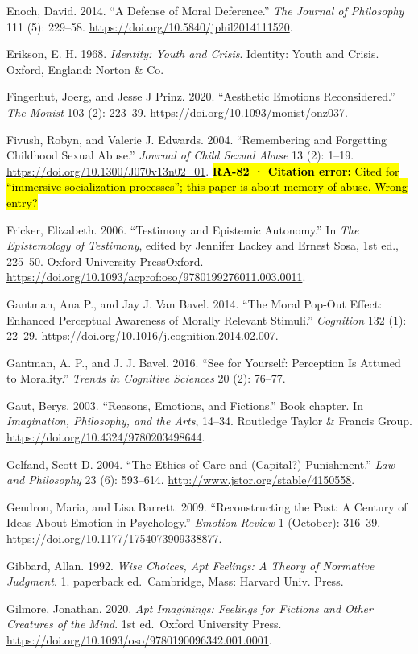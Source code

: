 \documentclass[
  letterpaper,
  DIV=11,
  numbers=noendperiod]{scrartcl}
\theoremstyle{remark}
\begin{document}
Enoch, David. 2014. ``A Defense of Moral Deference.'' \emph{The Journal
of Philosophy} 111 (5): 229--58.
\url{https://doi.org/10.5840/jphil2014111520}.

Erikson, E. H. 1968. \emph{Identity: Youth and Crisis}. Identity: Youth
and Crisis. Oxford, England: Norton \& Co.

Fingerhut, Joerg, and Jesse J Prinz. 2020. ``Aesthetic Emotions
Reconsidered.'' \emph{The Monist} 103 (2): 223--39.
\url{https://doi.org/10.1093/monist/onz037}.

Fivush, Robyn, and Valerie J. Edwards. 2004. ``Remembering and
Forgetting Childhood Sexual Abuse.'' \emph{Journal of Child Sexual
Abuse} 13 (2): 1--19. \url{https://doi.org/10.1300/J070v13n02_01}.
\hl{\textbf{RA-82 · Citation error:} Cited for ``immersive socialization
processes''; this paper is about memory of abuse. Wrong entry?}

Fricker, Elizabeth. 2006. ``Testimony and Epistemic Autonomy.'' In
\emph{The Epistemology of Testimony}, edited by Jennifer Lackey and
Ernest Sosa, 1st ed., 225--50. Oxford University PressOxford.
\url{https://doi.org/10.1093/acprof:oso/9780199276011.003.0011}.

Gantman, Ana P., and Jay J. Van Bavel. 2014. ``The Moral Pop-Out Effect:
Enhanced Perceptual Awareness of Morally Relevant Stimuli.''
\emph{Cognition} 132 (1): 22--29.
\url{https://doi.org/10.1016/j.cognition.2014.02.007}.

Gantman, A. P., and J. J. Bavel. 2016. ``See for Yourself: Perception Is
Attuned to Morality.'' \emph{Trends in Cognitive Sciences} 20 (2):
76--77.

Gaut, Berys. 2003. ``Reasons, Emotions, and Fictions.'' Book chapter. In
\emph{Imagination, Philosophy, and the Arts}, 14--34. Routledge Taylor
\& Francis Group. \url{https://doi.org/10.4324/9780203498644}.

Gelfand, Scott D. 2004. ``The Ethics of Care and (Capital?)
Punishment.'' \emph{Law and Philosophy} 23 (6): 593--614.
\url{http://www.jstor.org/stable/4150558}.

Gendron, Maria, and Lisa Barrett. 2009. ``Reconstructing the Past: A
Century of Ideas About Emotion in Psychology.'' \emph{Emotion Review} 1
(October): 316--39. \url{https://doi.org/10.1177/1754073909338877}.

Gibbard, Allan. 1992. \emph{Wise Choices, Apt Feelings: A Theory of
Normative Judgment}. 1. paperback ed.~Cambridge, Mass: Harvard Univ.
Press.

Gilmore, Jonathan. 2020. \emph{Apt Imaginings: Feelings for Fictions and
Other Creatures of the Mind}. 1st ed.~Oxford University Press.
\url{https://doi.org/10.1093/oso/9780190096342.001.0001}.
\end{document}
